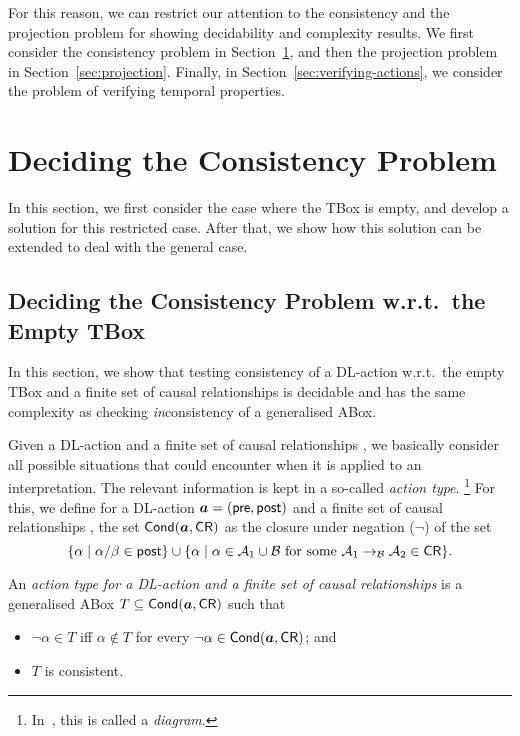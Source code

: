 \noindent
For this reason, we can restrict our attention to the consistency and the
projection problem for showing decidability and complexity results.  We first
consider the consistency problem in Section~\ref{sec:consistency}, and then the
projection problem in Section~\ref{sec:projection}.  Finally, in
Section~\ref{sec:verifying-actions}, we consider the problem of verifying
temporal properties.


\section{Deciding the Consistency Problem}\label{sec:consistency}

In this section, we first consider the case where the TBox is empty,
and develop a solution for this restricted case.  After that, we show how this
solution can be extended to deal with the general case.


\subsection{Deciding the Consistency Problem w.r.t.\ the Empty TBox}

In this section, we show that testing consistency of a DL-action w.r.t.\ the
empty TBox and a finite set of causal relationships is decidable and has the
same complexity as checking \emph{in}consistency of a generalised ABox.

Given a DL-action \abf and a finite set of causal relationships \CR, we
basically consider all possible situations that \abf could encounter when it is
applied to an interpretation.  The relevant information is kept in a so-called
\emph{action type}.%
\footnote{In~\cite{BaLL-LPAR10}, this is called a \emph{diagram}.}
For this, we define for a DL-action $\boldsymbol a=(\mathsf{pre},\mathsf{post})$ and a finite
set of causal relationships \CR, the set $\operatorname{\mathsf{Cond}}(\boldsymbol a,\mathsf{CR})$ as the closure under
negation ($\lnot$) of the set
\[\{\alpha\mid\alpha/\beta\in\post\}\cup%
    \{\alpha\mid\alpha\in\Amc_1\cup\Bmc%
    \text{ for some }\causes{\Amc_1}{\Amc_2}{\Bmc}\in\CR\}.\]

\begin{definition}\label{def:action-type}
    An \emph{action type for a DL-action \abf and a finite set of causal
    relationships \CR} is a generalised ABox $T\subseteq\operatorname{\mathsf{Cond}}(\boldsymbol a,\mathsf{CR})$ such
    that
    \begin{itemize}
        \item $\lnot\alpha\in T$ iff $\alpha\notin T$ for every
            $\lnot\alpha\in\operatorname{\mathsf{Cond}}(\boldsymbol a,\mathsf{CR})$; and
        \item $T$ is consistent.
    \end{itemize}
\end{definition}


